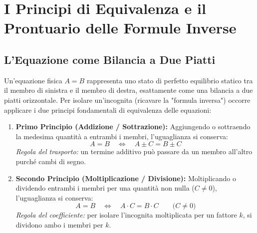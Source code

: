 \documentclass[11pt,a4paper,oneside]{report}
\begin{document}
\chapter{I Principi di Equivalenza e il Prontuario delle Formule Inverse}

\section{L'Equazione come Bilancia a Due Piatti}
Un'equazione fisica $A = B$ rappresenta uno stato di perfetto equilibrio statico tra il membro di sinistra e il membro di destra, esattamente come una bilancia a due piatti orizzontale.
Per isolare un'incognita (ricavare la "formula inversa") occorre applicare i due principi fondamentali di equivalenza delle equazioni:

\begin{leggefisica}
\begin{enumerate}
  \item \textbf{Primo Principio (Addizione / Sottrazione):} Aggiungendo o sottraendo la medesima quantità a entrambi i membri, l'uguaglianza si conserva:
  \[
  A = B \quad \Longleftrightarrow \quad A \pm C = B \pm C
  \]
  \textit{Regola del trasporto:} un termine additivo può passare da un membro all'altro purché cambi di segno.
  \item \textbf{Secondo Principio (Moltiplicazione / Divisione):} Moltiplicando o dividendo entrambi i membri per una quantità non nulla ($C \neq 0$), l'uguaglianza si conserva:
  \[
  A = B \quad \Longleftrightarrow \quad A \cdot C = B \cdot C \qquad \Big( C \neq 0 \Big)
  \]
  \textit{Regola del coefficiente:} per isolare l'incognita moltiplicata per un fattore $k$, si dividono ambo i membri per $k$.
\end{enumerate}
\end{leggefisica}
\end{document}
